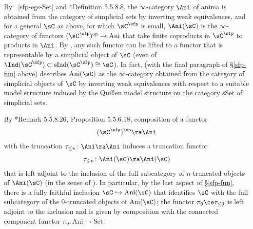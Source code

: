 By ~\ref{sfp-egs-Set} and \cite{HTT}*{Definition 5.5.8.8}, the $\infty$-category $\Ani$ of anima is obtained from the category of simplicial sets by inverting weak equivalences, and for a general $\sC$ as above, for which $\sC^\sfp$ is small, $\Ani(\sC)$ is the $\infty$-category of functors $(\sC^{\sfp})^\mathrm{op}\to \mathrm{Ani}$ that take finite coproducts in $\sC^{\sfp}$ to products in $\Ani$.
By \cite[Lemma 5.5.8.14]{HTT}, any such functor can be lifted to a %
functor that is representable by a simplicial object of $\sC$ (even of $\Ind(\sC^{\sfp}) \subset \mathrm{sInd}(\sC^\sfp) \cong \sC$).
In fact, \cite[Corollary 5.5.9.3]{HTT} (with the final paragraph of \S\ref{sfp-fun} above) describes $\mathrm{Ani}(\sC)$ as the $\infty$-category obtained from the category of simplicial objects of $\sC$ by inverting weak equivalences with respect to a suitable model structure induced by the Quillen model structure on the category $\mathrm{sSet}$ of simplicial sets. %

By \cite{HTT}*{Remark 5.5.8.26, Proposition 5.5.6.18}, composition of a functor
\[
(\sC^\sfp)^\op \ra \Ani
\]
with the truncation $\tau_{\le n} \colon \Ani \ra \Ani$ induces a truncation functor
\[
\tau_{\le n} \colon \Ani(\sC) \ra \Ani(\sC)
\]
that is left adjoint to the inclusion of the full subcategory of $n$-truncated objects of $\Ani(\sC)$ (in the sense of \cite[Definition~5.5.6.1]{HTT}). In particular, by the last aspect of \S\ref{sfp-fun}, there is a fully faithful inclusion $\sC\hookrightarrow \mathrm{Ani}(\sC)$ that identifies $\sC$ with the full subcategory of the $0$-truncated objects of $\mathrm{Ani}(\sC)$; the functor $\pi_0 \ce \tau_{\le 0}$ is left adjoint to the inclusion and is given by composition with the  connected component functor $\pi_0\colon \mathrm{Ani}\to \mathrm{Set}$. %

